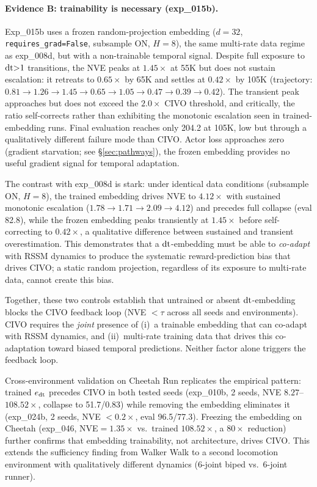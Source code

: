 \paragraph{Evidence B: trainability is necessary (exp\_015b).}
Exp\_015b uses a frozen random-projection embedding ($d{=}32$, \texttt{requires\_grad=False}, subsample ON, $H{=}8$), the same multi-rate data regime as exp\_008d, but with a non-trainable temporal signal. Despite full exposure to $\mathrm{dt}{>}1$ transitions, the NVE peaks at $1.45\times$ at 55K but does not sustain escalation: it retreats to $0.65\times$ by 65K and settles at $0.42\times$ by 105K (trajectory: $0.81 \rightarrow 1.26 \rightarrow 1.45 \rightarrow 0.65 \rightarrow 1.05 \rightarrow 0.47 \rightarrow 0.39 \rightarrow 0.42$). The transient peak approaches but does not exceed the $2.0\times$ CIVO threshold, and critically, the ratio self-corrects rather than exhibiting the monotonic escalation seen in trained-embedding runs. Final evaluation reaches only 204.2 at 105K, low but through a qualitatively different failure mode than CIVO. Actor loss approaches zero (gradient starvation; see \S\ref{sec:pathways}), the frozen embedding provides no useful gradient signal for temporal adaptation.

The contrast with exp\_008d is stark: under identical data conditions (subsample ON, $H{=}8$), the trained embedding drives NVE to $4.12\times$ with sustained monotonic escalation ($1.78 \rightarrow 1.71 \rightarrow 2.09 \rightarrow 4.12$) and precedes full collapse (eval 82.8), while the frozen embedding peaks transiently at $1.45\times$ before self-correcting to $0.42\times$, a qualitative difference between sustained and transient overestimation. This demonstrates that a $\mathrm{dt}$-embedding must be able to \emph{co-adapt} with RSSM dynamics to produce the systematic reward-prediction bias that drives CIVO; a static random projection, regardless of its exposure to multi-rate data, cannot create this bias.

Together, these two controls establish that untrained or absent $\mathrm{dt}$-embedding blocks the CIVO feedback loop (NVE $< \tau$ across all seeds and environments). CIVO requires the \emph{joint} presence of (i)~a trainable embedding that can co-adapt with RSSM dynamics, and (ii)~multi-rate training data that drives this co-adaptation toward biased temporal predictions. Neither factor alone triggers the feedback loop.

Cross-environment validation on Cheetah Run replicates the empirical pattern: trained $e_{\mathrm{dt}}$ precedes CIVO in both tested seeds (exp\_010b, 2 seeds, NVE $8.27$--$108.52\times$, collapse to 51.7/0.83) while removing the embedding eliminates it (exp\_024b, 2 seeds, NVE $<0.2\times$, eval 96.5/77.3). Freezing the embedding on Cheetah (exp\_046, NVE${=}1.35\times$ vs.\ trained $108.52\times$, a $80\times$ reduction) further confirms that embedding trainability, not architecture, drives CIVO. This extends the sufficiency finding from Walker Walk to a second locomotion environment with qualitatively different dynamics (6-joint biped vs.\ 6-joint runner).

